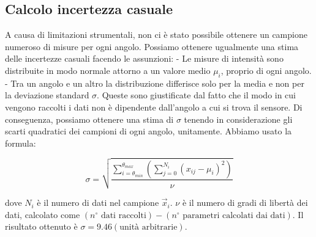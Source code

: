 \documentclass[12pt, a4paper, twoside]{article}
\begin{document}
  \subsection{Calcolo incertezza casuale}\label{subsec:calcolo-incertezza-casuale}
    A causa di limitazioni strumentali, non ci è stato possibile ottenere un campione
    numeroso di misure per ogni angolo. Possiamo ottenere ugualmente
    una stima delle incertezze casuali facendo le assunzioni: %
    - Le misure di intensità sono distribuite in modo normale attorno a un valore
      medio $\mu_i$, proprio di ogni angolo.
    - Tra un angolo e un altro la distribuzione differisce solo per la media e non per la
      deviazione standard $\sigma$.
    Queste sono giustificate dal fatto che il modo in cui vengono raccolti i dati
    non è dipendente dall'angolo a cui si trova il sensore.
    Di conseguenza, possiamo ottenere una stima di $\sigma$ tenendo in considerazione
    gli scarti quadratici dei campioni di ogni angolo, unitamente.
    Abbiamo usato la formula:

    \begin{equation}
      \sigma = \sqrt{
        \frac {
          \sum_{i = \theta_{min}}^{\theta_{max}} \left(
            \sum_{j = 0}^{N_i} (x_{ij} -\mu_i)^2
          \right)
        } {
          \nu
        }
      }
    \end{equation}

    \noindent dove $N_i$ è il numero di dati nel campione $\vec{x}_i$.
    $\nu$ è il numero di gradi di libertà dei dati, calcolato come
    $(n^\circ \text{ dati raccolti}) - (n^\circ \text{ parametri calcolati dai dati})$.
    Il risultato ottenuto è $\sigma = 9.46 (\text{unità arbitrarie})$.  %
\end{document}
